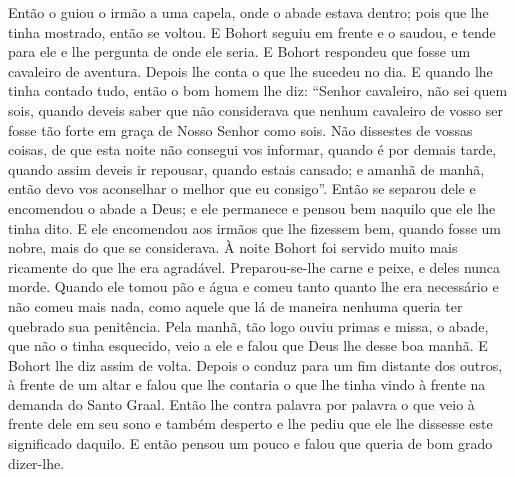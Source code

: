 Então o guiou o irmão a uma capela, onde o abade estava dentro; pois que lhe
tinha mostrado, então se voltou. E Bohort seguiu em frente e o saudou, e tende
para ele e lhe pergunta de onde ele seria. E Bohort respondeu que fosse um
cavaleiro de aventura. Depois lhe conta o que lhe sucedeu no dia. E quando lhe
tinha contado tudo, então o bom homem lhe diz: “Senhor cavaleiro, não sei quem
sois, quando deveis saber que não considerava que nenhum cavaleiro de vosso ser
fosse tão forte em graça de Nosso Senhor como sois. Não dissestes de vossas
coisas, de que esta noite não consegui vos informar, quando é por demais tarde,
quando assim deveis ir repousar, quando estais cansado; e amanhã de manhã, 
então devo vos aconselhar o melhor que eu consigo”. Então se separou dele e
encomendou o abade a Deus; e ele permanece e pensou bem naquilo que ele lhe
tinha dito. E ele encomendou aos irmãos que lhe fizessem bem, quando fosse um
nobre, mais do que se considerava. À noite Bohort foi servido muito
mais ricamente do que lhe era agradável. Preparou-se-lhe carne e peixe, e deles
nunca morde. Quando ele tomou pão e água e comeu tanto quanto lhe era
necessário e não comeu mais nada, como aquele que lá de maneira nenhuma queria
ter quebrado sua penitência. Pela manhã, tão logo ouviu primas e missa, o
abade, que não o tinha esquecido, veio a ele e falou que Deus lhe desse boa
manhã. E Bohort lhe diz assim de volta. Depois o conduz para um fim distante
dos outros, à frente de um altar e falou que lhe contaria o que lhe tinha vindo
à frente na demanda do Santo Graal. Então lhe contra palavra por palavra o que
veio à frente dele em seu sono e também desperto e lhe pediu que ele lhe
dissesse este significado daquilo. E então pensou um pouco e falou que queria
de bom grado dizer-lhe. 

